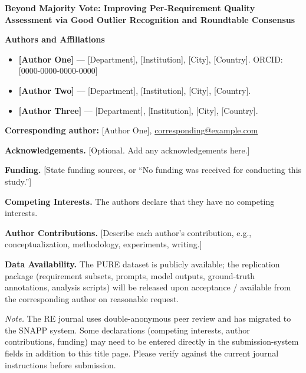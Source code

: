 \documentclass[11pt]{article}
\begin{document}
\begin{center}
{\LARGE\bfseries Beyond Majority Vote: Improving Per-Requirement Quality\\[4pt]
Assessment via Good Outlier Recognition and Roundtable Consensus}
\end{center}

\bigskip
\noindent\textbf{Authors and Affiliations}

\begin{itemize}
  \item \textbf{[Author One]} — [Department], [Institution], [City], [Country]. ORCID: [0000-0000-0000-0000]
  \item \textbf{[Author Two]} — [Department], [Institution], [City], [Country].
  \item \textbf{[Author Three]} — [Department], [Institution], [City], [Country].
\end{itemize}

\noindent\textbf{Corresponding author:} [Author One], \href{mailto:corresponding@example.com}{corresponding@example.com}

\bigskip
\noindent\textbf{Acknowledgements.} [Optional. Add any acknowledgements here.]

\medskip
\noindent\textbf{Funding.} [State funding sources, or ``No funding was received for conducting this study.'']

\medskip
\noindent\textbf{Competing Interests.} The authors declare that they have no competing interests.

\medskip
\noindent\textbf{Author Contributions.} [Describe each author's contribution, e.g., conceptualization, methodology, experiments, writing.]

\medskip
\noindent\textbf{Data Availability.} The PURE dataset is publicly available; the replication package (requirement subsets, prompts, model outputs, ground-truth annotations, analysis scripts) will be released upon acceptance / available from the corresponding author on reasonable request.

\bigskip
\noindent\textit{Note.} The RE journal uses double-anonymous peer review and has migrated to the SNAPP system. Some declarations (competing interests, author contributions, funding) may need to be entered directly in the submission-system fields in addition to this title page. Please verify against the current journal instructions before submission.
\end{document}
